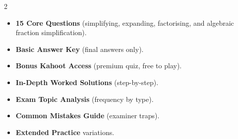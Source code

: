 \documentclass[11pt,a4paper]{article}
\newcommand{\FullReleaseDate}{April 30, 2026}
\begin{document}
\vspace{8pt}

\begin{multicols}{2}
  \begin{tcolorbox}[card, title=\sffamily\bfseries\textcolor{white}{\faHandPointDown\ TODAY (Simplified Version)}, colbacktitle=mainblue, boxed title style={sharp corners, boxrule=0pt}]
    \begin{itemize}[leftmargin=1.2em, itemsep=2pt]
      \item \small \textbf{15 Core Questions} (simplifying, expanding, factorising, and algebraic fraction simplification).
      \item \small \textbf{Basic Answer Key} (final answers only).
      \item \small \textbf{Bonus Kahoot Access} (premium quiz, free to play).
    \end{itemize}
  \end{tcolorbox}

  \columnbreak

  \begin{tcolorbox}[card, title=\sffamily\bfseries\textcolor{white}{\faRocket\ ON \FullReleaseDate\ (Full Upgrade)}, colbacktitle=mainblue, boxed title style={sharp corners, boxrule=0pt}]
    \begin{itemize}[leftmargin=1.2em, itemsep=2pt]
      \item \small \textbf{In-Depth Worked Solutions} (step-by-step).
      \item \small \textbf{Exam Topic Analysis} (frequency by type).
      \item \small \textbf{Common Mistakes Guide} (examiner traps).
      \item \small \textbf{Extended Practice} variations.
    \end{itemize}
  \end{tcolorbox}
\end{multicols}
\end{document}
